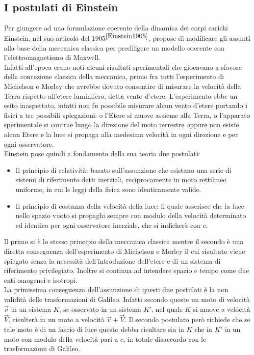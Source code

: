 \subsection{I postulati di Einstein}\label{Sec:postulati}
Per giungere ad una formulazione coerente della dinamica dei corpi carichi Einstein, nel suo articolo del 1905$^{\cite{Einstein1905}}$, propose di modificare gli assunti alla base della meccanica classica per prediligere un modello coerente con l'elettromagnetismo di Maxwell.\\Infatti all'epoca erano noti alcuni risultati sperimentali che giocavano a sfavore della concezione classica della meccanica, primo fra tutti l'esperimento di Michelson e Morley che avrebbe dovuto consentire di misurare la velocità della Terra rispetto all'etere luminifero, detta vento d'etere. L'esperimento ebbe un esito inaspettato, infatti non fu possibile misurare alcun vento d'etere portando i fisici a tre possibili spiegazioni: o l'Etere si muove assieme alla Terra, o l'apparato sperimentale si contrae lungo la direzione del moto terrestre oppure non esiste alcun Etere e la luce si propaga alla medesima velocità in ogni direzione e per ogni osservatore.\\
\newpage
Einstein pose quindi a fondamento della sua teoria due postulati:
\begin{itemize}
    \item Il principio di relatività: basato sull'assunzione che esistano  una serie di sistemi di riferimento detti inerziali, reciprocamente in moto rettilineo uniforme, in cui le leggi della fisica sono identicamente valide.
    \item Il principio di costanza della velocità della luce: il quale asserisce che la luce nello spazio vuoto si propaghi sempre con modulo della velocità determinato ed identico per ogni osservatore inerziale, che si indicherà con $c$. 
\end{itemize}
Il primo si è lo stesso principio della meccanica classica mentre il secondo è una diretta conseguenza dell'esperimento di Michelson e Morley il cui risultato viene spiegato senza la necessità dell'introduzione dell'etere e di un sistema di riferimento privilegiato. Inoltre si continua ad intendere spazio e tempo come due enti omogenei e isotropi.\\

La primissima conseguenza dell'assunzione di questi due postulati è la non validità delle trasformazioni di Galileo. Infatti secondo queste un moto di velocità $\vec{v}$ in un sistema $K$, se osservato in un sistema $K'$, nel quale $K$ si muove a velocità $\vec{V}$, risulterà in un moto a velocità $\vec{v}+\vec{V}$. Il secondo postulato però richiede che se tale moto è di un fascio di luce questo debba risultare sia in $K$ che in $K'$ in un moto con modulo della velocità pari a $c$, in totale disaccordo con le trasformazioni di Galileo.\\

